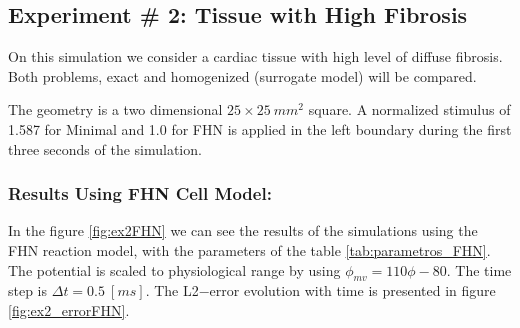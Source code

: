 \subsection{Experiment \# 2: Tissue with High Fibrosis}

On this simulation we consider a cardiac tissue with high level of diffuse fibrosis. Both problems, exact and homogenized (surrogate model) will be compared. 

The geometry is a two dimensional $25 \times 25~mm^2$ square. A normalized stimulus of 1.587 for Minimal and 1.0 for FHN is applied in the left boundary during the first three seconds of the simulation. 

\subsubsection{Results Using FHN Cell Model:}

In the figure \ref{fig:ex2FHN} we can see the results of the simulations using the FHN reaction model, with the parameters of the table \ref{tab:parametros_FHN}. The potential is scaled to physiological range by using $\phi_{mv} = 110 \phi - 80$. The time step is $\Delta t = 0.5~[ms]$. The L2$-$error evolution with time is presented in figure \ref{fig:ex2_errorFHN}.

